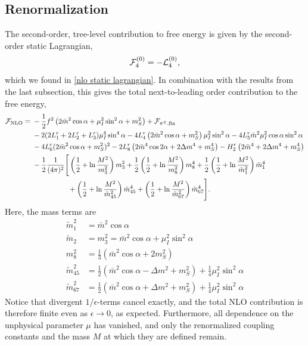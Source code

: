 \subsection{Renormalization}

The second-order, tree-level contribution to free energy is given by the second-order static Lagrangian,
%
\begin{equation}
    \mathcal{F}^{(0)}_4 = - \mathcal{L}_4^{(0)},
\end{equation}
%
which we found in \autoref{nlo static lagrangian}.
In combination with the results from the last subsection, this gives the total next-to-leading order contribution to the free energy,
%
\begin{align}
    \nonumber
    \mathcal{F}_{\text{NLO}}
    ={}&
    -\frac{1}{2} f^2 
    \left( 2 \bar m^2 \cos\alpha + \mu_I^2 \sin^2\alpha + m_S^2\right)
    + \mathcal{F}_{{\pi^\pm},\text{fin}} \\ \nonumber
    &-2(2L_1^r + 2L_2^r + L_3^r) \mu_I^4 \sin^4\alpha
    - 4  L_4^r \left( 2 \bar m^2 \cos\alpha + m_S^2 \right) \mu_I^2\sin^2\alpha
    - 4 L_5^r \bar m^2 \mu_I^2 \cos\alpha \sin^2 \alpha 
    \\ \nonumber
    & 
    - 4 L_6^r (2\bar m^2\cos\alpha + m_S^2)^2
    - 2 L_8^r \left(2 \bar m^4 \cos2\alpha + 2 \Delta m^4 + m_S^4\right)
    - H_2^r \left(2\bar m^4 + 2\Delta m^4 + m_S^4 \right) \\\nonumber
    & - \frac{1}{2} \frac{1}{(4 \pi)^2}  
    \Bigg[
        \left(
            \frac{1}{2} + \ln\frac{M^2}{m_3^2}
        \right)
        m_3^2
        + 
        \frac{1}{2}
        \left(
            \frac{1}{2} + \ln\frac{M^2}{m_8^2} 
        \right)
        m_8^4
        +
        \frac{1}{2}
        \left(
            \frac{1}{2} + \ln\frac{M^2}{\tilde m_1^2}
        \right)
        \tilde m_1^4
        \\
        & 
        \quad\quad\quad\quad\quad
        +
        \left(
            \frac{1}{2} + \ln\frac{M^2}{\tilde m_{45}^2}
        \right)
        \tilde m_{45}^4
        +
        \left(
            \frac{1}{2} + \ln\frac{M^2}{\tilde m_{67}^2} 
        \right)
        \tilde m_{67}^4
    \Bigg].
\end{align}
%
Here, the mass terms are
%
\begin{align}
    \tilde m_1^2 
    & =
    \bar m^2 \cos\alpha \\
    \tilde m_2 &= m_3^2 = \bar m^2 \cos\alpha + \mu_I^2 \sin^2\alpha \\
    m_8^2 & = \frac{1}{3} (\bar m^2 \cos\alpha + 2m_S^2) \\
    \tilde m_{45}^2 & 
    = \frac{1}{2}(\bar m^2 \cos \alpha - \Delta m^2 + m_S^2)
    + \frac{1}{4} \mu_I^2\sin^2\alpha \\
    \tilde m_{67}^2 & 
    = \frac{1}{2}(\bar m^2 \cos \alpha + \Delta m^2 + m_S^2)
    + \frac{1}{4} \mu_I^2\sin^2\alpha
\end{align}
%
Notice that divergent $1/\epsilon$-terms cancel exactly, and the total NLO contribution is therefore finite even as $\epsilon\rightarrow 0$, as expected.
Furthermore, all dependence on the unphysical parameter $\mu$ has vanished, and only the renormalized coupling constants and the mass $M$ at which they are defined remain.

